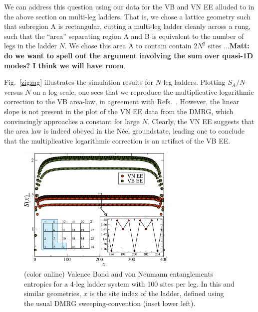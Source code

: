 \documentclass[prl,aps,twocolumn,floatfix,amsmath,amssymb,superscriptaddress,tightenlines]{revtex4}
\begin{document}
We can address this question using our data for the VB and VN EE alluded to in the above section on multi-leg ladders.  That is, we chose a lattice geometry such that subregion A is rectangular, cutting a multi-leg ladder cleanly across a rung, such that the ``area'' separating region A and B is equivalent to the number of legs in the ladder $N$.  We chose this area A to contain contain $2N^2$ sites ...{\bf Matt: do we want to spell out the argument involving the sum over quasi-1D modes?  I think we will have room}.

Fig.~\ref{zigzag} illustrates the simulation results for $N$-leg ladders.  Plotting $S_A/N$ versus $N$ on a log scale, one sees that we reproduce the multiplicative logarithmic correction to the VB area-law, in agreement with Refs.~\cite{Alet,Chh}.  However, the linear slope is not present in the plot of the VN EE data from the DMRG, which convincingly approaches a constant for large $N$.  Clearly, the VN EE suggests that the area law is indeed obeyed in the N\'eel groundstate, leading one to conclude that the multiplicative logarithmic correction is an artifact of the VB EE.


\begin{figure}
{
\includegraphics[width=3in]{FIG2.eps}
\caption{(color online) Valence Bond and von Neumann entanglements entropies for a 4-leg ladder system with 100 sites per leg.  In this and similar geometries, $x$ is the site index of the ladder, defined using the usual DMRG sweeping-convention (inset lower left).  
\label{ladder}}}
\end{figure}
\end{document}

